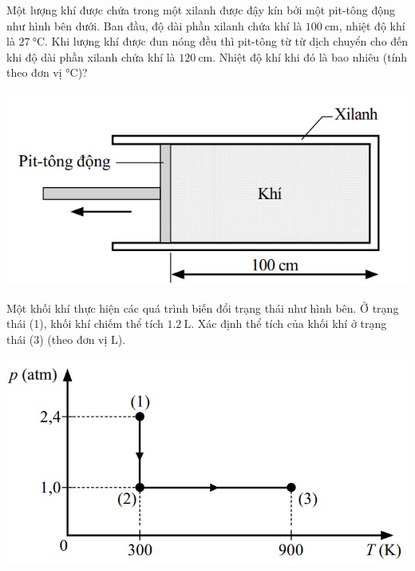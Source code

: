 \begin{ex}
	Một lượng khí được chứa trong một xilanh được đậy kín bởi một pit-tông động như hình bên dưới. Ban đầu, độ dài phần xilanh chứa khí là $\SI{100}{\centi\meter}$, nhiệt độ khí là $\SI{27}{\celsius}$. Khi lượng khí được đun nóng đều thì pit-tông từ từ dịch chuyển cho đến khi độ dài phần xilanh chứa khí là $\SI{120}{\centi\meter}$. Nhiệt độ khí khi đó là bao nhiêu (tính theo đơn vị $\si{\celsius}$)?
	\begin{center}
		\includegraphics[width=0.4\linewidth]{../figs/G12C2-7}
	\end{center}
\end{ex}
\begin{ex}
	Một khối khí thực hiện các quá trình biến đổi trạng thái như hình bên. Ở trạng thái (1), khối khí chiếm thể tích
	$\SI{1.2}{\liter}$. Xác định thể tích của khối khí ở trạng thái (3) (theo đơn vị $\si{\liter}$).
	\begin{center}
		\includegraphics[width=0.4\linewidth]{../figs/G12C2-8}
	\end{center}
\end{ex}
